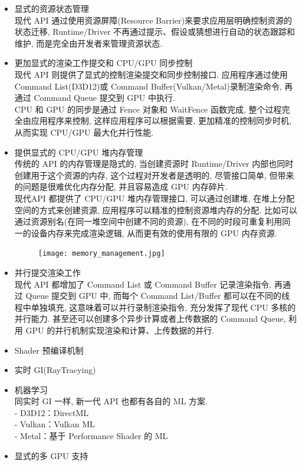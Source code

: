 \documentclass[UTF8]{ctexart}
\begin{document}
\begin{itemize}
\begin{figure}[h]
    \centering
  \end{figure}
\item 显式的资源状态管理
  \\现代 API 通过使用资源屏障(Resource Barrier)来要求应用层明确控制资源的状态迁移,  Runtime/Driver 不再通过提示、假设或猜想进行自动的状态跟踪和维护, 而是完全由开发者来管理资源状态.
\item 更加显式的渲染工作提交和 CPU/GPU 同步控制
  \\现代 API 则提供了显式的控制渲染提交和同步控制接口. 应用程序通过使用 Command List(D3D12)或 Command Buffer(Vulkan/Metal)录制渲染命令, 再通过 Command Queue 提交到 GPU 中执行.
  \\CPU 和 GPU 的同步是通过 Fence 对象和 WaitFence 函数完成, 整个过程完全由应用程序来控制, 这样应用程序可以根据需要, 更加精准的控制同步时机, 从而实现 CPU/GPU 最大化并行性能.
\item 提供显式的 CPU/GPU 堆内存管理
  \\传统的 API 的内存管理是隐式的, 当创建资源时 Runtime/Driver 内部也同时创建用于这个资源的内存, 这个过程对开发者是透明的, 尽管接口简单, 但带来的问题是很难优化内存分配, 并且容易造成 GPU 内存碎片.
  \\现代API 都提供了 CPU/GPU 堆内存管理接口, 可以通过创建堆, 在堆上分配空间的方式来创建资源, 应用程序可以精准的控制资源堆内存的分配. 比如可以通过资源别名(在同一堆空间中创建不同的资源), 在不同的时段可重复利用同一的设备内存来完成渲染逻辑, 从而更有效的使用有限的 GPU 内存资源.
  \begin{figure}[h]
    \texttt{[image: memory\_management.jpg]}
    \centering
  \end{figure}
\item 并行提交渲染工作
  \\现代 API 都增加了 Command List 或 Command Buffer 记录渲染指令, 再通过 Queue 提交到 GPU 中, 而每个 Command List/Buffer 都可以在不同的线程中单独填充, 这意味着可以并行录制渲染指令, 充分发挥了现代 CPU 多核的并行能力. 甚至还可以创建多个异步计算或者上传数据的 Command Queue, 利用 GPU 的并行机制实现渲染和计算、上传数据的并行.
\item Shader 预编译机制
\item 实时 GI(RayTracying)
\item 机器学习
  \\同实时 GI 一样, 新一代 API 也都有各自的 ML 方案.
  \\- D3D12：DirectML
  \\- Vulkan：Vulkan ML
  \\- Metal：基于 Performance Shader 的 ML
\item 显式的多 GPU 支持
\end{itemize}
\end{document}
